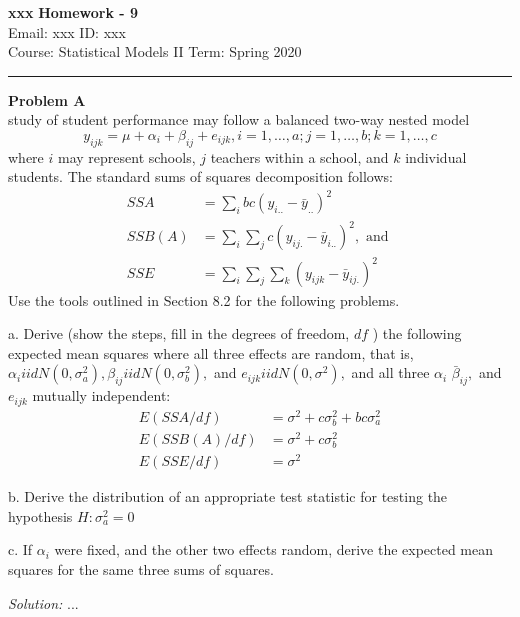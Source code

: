 \documentclass[a4paper, 11pt]{article}
\newenvironment{problem}[2][Problem]
    { \begin{mdframed}[backgroundcolor=gray!20] \textbf{#1 #2} \\}
    {  \end{mdframed}}
\newenvironment{solution}
    {\textit{Solution:}}
    {}
\begin{document}
\noindent
\large\textbf{xxx} \hfill \textbf{Homework - 9}   \\
Email: xxx \hfill ID: xxx \\
\normalsize Course: Statistical Models II \hfill Term: Spring 2020\\
\noindent\rule{7in}{2.8pt}
\begin{problem}{8.13}
A study of student performance may follow a balanced two-way nested model
$$
y_{i j k}=\mu+\alpha_{i}+\beta_{i j}+e_{i j k}, i=1, \ldots, a ; j=1, \ldots, b ; k=1, \ldots, c
$$
where $i$ may represent schools, $j$ teachers within a school, and $k$ individual students. The standard sums of squares decomposition follows:
$$
\begin{aligned}
S S A &=\sum_{i} b c\left(y_{i . .}-\bar{y}_{. .}\right)^{2} \\
S S B(A) &=\sum_{i} \sum_{j} c\left(y_{i j .}-\bar{y}_{i . .}\right)^{2}, \text { and } \\
S S E &=\sum_{i} \sum_{j} \sum_{k}\left(y_{i j k}-\bar{y}_{i j .}\right)^{2}
\end{aligned}
$$
Use the tools outlined in Section 8.2 for the following problems.

a. Derive (show the steps, fill in the degrees of freedom, $d f$ ) the following expected mean squares where all three effects are random, that is, $\alpha_{i} i i d N\left(0, \sigma_{a}^{2}\right), \beta_{i j} i i d N\left(0, \sigma_{b}^{2}\right),$ and $e_{i j k} i i d N\left(0, \sigma^{2}\right),$ and all three $\alpha_{i}$
$\bar{\beta}_{i j},$ and $e_{i j k}$ mutually independent:
$$
\begin{aligned}
E(S S A / d f) &=\sigma^{2}+c \sigma_{b}^{2}+b c \sigma_{a}^{2} \\
E(S S B(A) / d f) &=\sigma^{2}+c \sigma_{b}^{2} \\
E(S S E / d f) &=\sigma^{2}
\end{aligned}
$$

b. Derive the distribution of an appropriate test statistic for testing the hypothesis $H: \sigma_{a}^{2}=0$

c. If $\alpha_{i}$ were fixed, and the other two effects random, derive the expected mean squares for the same three sums of squares.
\end{problem}
\begin{solution}
...
\end{solution} 
\end{document}
